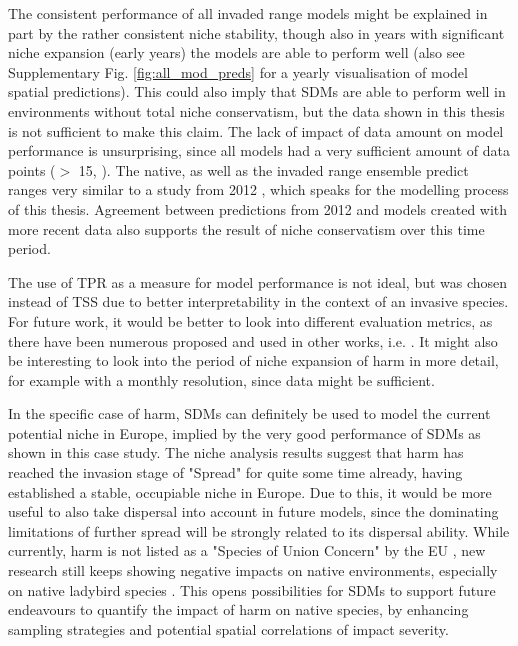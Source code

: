\documentclass[12pt,a4paper]{article}
\begin{document}
The consistent performance of all invaded range models might be explained in part by the rather consistent niche stability, though also in years with significant niche expansion (early years) the models are able to perform well (also see Supplementary Fig. \ref{fig:all_mod_preds} for a yearly visualisation of model spatial predictions).
This could also imply that SDMs are able to perform well in environments without total niche conservatism, but the data shown in this thesis is not sufficient to make this claim.
The lack of impact of data amount on model performance is unsurprising, since all models had a very sufficient amount of data points ($>$ 15, \autocite{stoa2019SDMdata}).
The native, as well as the invaded range ensemble predict ranges very similar to a study from 2012 \autocite{bidinger2012harmSDMglobalMaxent}, which speaks for the modelling process of this thesis.
Agreement between predictions from 2012 and models created with more recent data also supports the result of niche conservatism over this time period.

The use of TPR as a measure for model performance is not ideal, but was chosen instead of TSS due to better interpretability in the context of an invasive species.
For future work, it would be better to look into different evaluation metrics, as there have been numerous proposed and used in other works, i.e. \autocite{konowalik2021SDMmetrics}.
It might also be interesting to look into the period of niche expansion of \gls{harm} in more detail, for example with a monthly resolution, since data might be sufficient.  

In the specific case of \gls{harm}, SDMs can definitely be used to model the current potential niche in Europe, implied by the very good performance of SDMs as shown in this case study.
The niche analysis results suggest that \gls{harm} has reached the invasion stage of "Spread" for quite some time already, having established a stable, occupiable niche in Europe.
Due to this, it would be more useful to also take dispersal into account in future models, since the dominating limitations of further spread will be strongly related to its dispersal ability.
While currently, \gls{harm} is not listed as a "Species of Union Concern" by the EU \autocite{EU2020speciesofunionconcern}, new research still keeps showing negative impacts on native environments, especially on native ladybird species \autocite{brown2022harmimpactigp}.
This opens possibilities for SDMs to support future endeavours to quantify the impact of \gls{harm} on native species, by enhancing sampling strategies and potential spatial correlations of impact severity.
\end{document}
